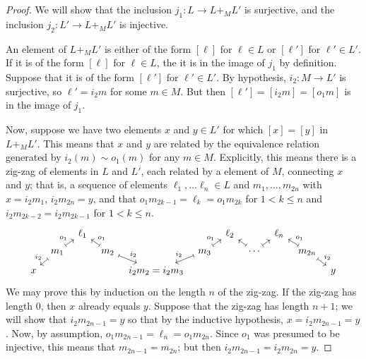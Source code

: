 \documentclass[DynamicalBook]{subfiles}
\begin{document}
    \begin{proof}
      We will show that the inclusion $j_{1} : L \to L +_{M} L'$ is surjective, and the inclusion $j_{2} : L' \to L +_{M} L'$ is injective.

      An element of $L +_{M} L'$ is either of the form $[\ell]$ for $\ell \in L$ or $[\ell
      '] $ for $\ell' \in L'$. If it is of the form $[\ell]$ for $\ell \in L$, the it is in the image of $j_{1}$ by definition. Suppose that it is of the form $[\ell']$ for $\ell' \in L'$. By hypothesis, $i_{2} : M \to L'$ is surjective, so $\ell' = i_{2}m$ for some $m \in M$. But then $[\ell'] = [i_{2}m] = [o_{1}m]$ is in the image of $j_{1}$.

      Now, suppose we have two elements $x$ and $y \in L'$ for which $[x] = [y]$ in $L +_{M} L'$. This means that $x$ and $y$ are related by the equivalence relation generated by $i_{2}(m) \sim o_{1}(m)$ for any $m \in M$. Explicitly, this means there is a zig-zag of elements in $L$ and $L'$, each related by a element of $M$, connecting $x$ and $y$; that is, a sequence of elements $\ell_{1}, \ldots \ell_{n} \in L$ and $m_{1}, \ldots, m_{2n}$ with $x = i_{2}m_{1} $, $i_{2}m_{2n} = y$, and that $o_{1}m_{2k -1} = \ell_{k} =  o_{1}m_{2k} $ for $1 < k \leq n$ and $i_{2}m_{2k -2} = i_{2}m_{2k-1}$ for $1 < k \leq n$.
\[
\begin{tikzcd}[sep = tiny]
	&& {\ell_1} &&&& {\ell_2} && {\ell_n} \\
	& {m_1} && {m_2} && {m_3} && \cdots && {m_{2n}} \\
	x &&&& {i_2m_2 = i_2m_3} &&&&&& y
	\arrow["{i_2}"', maps to, from=2-2, to=3-1]
	\arrow["{o_1}", maps to, from=2-2, to=1-3]
	\arrow["{o_1}"', maps to, from=2-4, to=1-3]
	\arrow["{i_2}", maps to, from=2-4, to=3-5]
	\arrow["{i_2}"', maps to, from=2-6, to=3-5]
	\arrow["{o_{1}}", maps to, from=2-6, to=1-7]
	\arrow[maps to, from=2-8, to=1-7]
	\arrow[maps to, from=2-8, to=1-9]
	\arrow["{o_1}"', maps to, from=2-10, to=1-9]
	\arrow["{i_2}", maps to, from=2-10, to=3-11]
\end{tikzcd}
\]
We may prove this by induction on the length $n$ of the zig-zag. If the zig-zag has length $0$, then $x$ already equals $y$. Suppose that the zig-zag has length $n+1$; we will show that $i_{2}m_{2n-1} = y$ so that by the inductive hypothesis, $x = i_{2}m_{2n-1} = y$. Now, by assumption, $o_{1}m_{2n-1} = \ell_{n} = o_{1}m_{2n}$. Since $o_{1}$ was presumed to be injective, this means that $m_{2n-1} = m_{2n}$; but then $i_{2}m_{2n-1} = i_{2}m_{2n} = y$.
    \end{proof}
\end{document}

